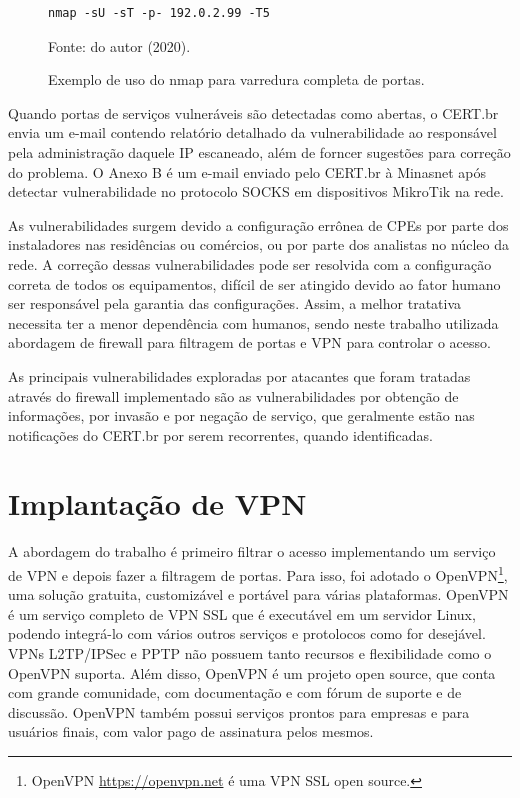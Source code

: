     \begin{figure}[!htb]
        \centering
        \caption{Exemplo de uso do nmap para varredura completa de portas.} 
        \label{fig:nmap} 
        
        \begin{Verbatim}[fontsize=\normalsize]
            nmap -sU -sT -p- 192.0.2.99 -T5
        \end{Verbatim} 
        
        {\small Fonte: do autor (2020).} 
    \end{figure}
    
    Quando portas de serviços vulneráveis são detectadas como abertas, o CERT.br envia um e-mail contendo relatório detalhado da vulnerabilidade ao responsável pela administração daquele IP escaneado, além de forncer sugestões para correção do problema. O Anexo B é um e-mail enviado pelo CERT.br à Minasnet após detectar vulnerabilidade no protocolo SOCKS em dispositivos MikroTik na rede.
    
    As vulnerabilidades surgem devido a configuração errônea de CPEs por parte dos instaladores nas residências ou comércios, ou por parte dos analistas no núcleo da rede. A correção dessas vulnerabilidades pode ser resolvida com a configuração correta de todos os equipamentos, difícil de ser atingido devido ao fator humano ser responsável pela garantia das configurações. Assim, a melhor tratativa necessita ter a menor dependência com humanos, sendo neste trabalho utilizada abordagem de firewall para filtragem de portas e VPN para controlar o acesso. 
    
    As principais vulnerabilidades exploradas por atacantes que foram tratadas através do firewall implementado são as vulnerabilidades por obtenção de informações, por invasão e por negação de serviço, que geralmente estão nas notificações do CERT.br por serem recorrentes, quando identificadas.

\section{Implantação de VPN}

    A abordagem do trabalho é primeiro filtrar o acesso implementando um serviço de VPN e depois fazer a filtragem de portas. Para isso, foi adotado o OpenVPN\footnote{OpenVPN \url{https://openvpn.net} é uma VPN SSL open source.}, uma solução gratuita, customizável e portável para várias plataformas. OpenVPN é um serviço completo de VPN SSL que é executável em um servidor Linux, podendo integrá-lo com vários outros serviços e protolocos como for desejável. VPNs L2TP/IPSec e PPTP não possuem tanto recursos e flexibilidade como o OpenVPN suporta. Além disso, OpenVPN é um projeto open source, que conta com grande comunidade, com documentação e com fórum de suporte e de discussão. OpenVPN também possui serviços prontos para empresas e para usuários finais, com valor pago de assinatura pelos mesmos.
    

